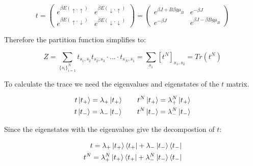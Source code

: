 \documentclass[12pt]{article}
\theoremstyle{plain}
\begin{document}
\begin{equation}
    t = 
    \left( \begin{array}{cc}
        e^{\beta E(\uparrow, \uparrow)} & e^{\beta E(\downarrow, \uparrow)} \\
        e^{\beta E(\uparrow, \downarrow)} & e^{\beta E(\downarrow, \downarrow)}
    \end{array}
    \right) = 
    \left( \begin{array}{cc}
        e^{\beta J + B\beta g\mu_{B}} & e^{-\beta J} \\
        e^{-\beta J} & e^{\beta J - \beta B g\mu_{B}}
    \end{array}
    \right)
    \label{t}
\end{equation}

\vspace{2mm}

\par Therefore the partition function simplifies to:

\vspace{2mm}

\begin{equation*}
    Z = \sum_{\{s_{i}\}_{i=1}^{N}} t_{s_1, s_2}t_{s_2, s_3} \cdot ... \cdot t_{s_N, s_1} = \sum_{s_1} [t^{N}]_{s_1, s_2} = Tr(t^{N})
\end{equation*}

\vspace{2mm}

\par To calculate the trace we need the eigenvalues and eigenstates of the $t$ matrix.

\vspace{2mm}

\begin{align*}
    t \ket{t_+} = \lambda_+ \ket{t_+} \quad \quad t^N \ket{t_+} = \lambda_+^N \ket{t_+} \\
    t \ket{t_-} = \lambda_- \ket{t_-} \quad \quad t^N \ket{t_-} = \lambda_-^N \ket{t_-}
\end{align*}

\vspace{2mm}

\par Since the eigenstates with the eigenvalues give the decompostion of $t$:

\vspace{2mm}

\begin{align*}
    t = \lambda_+ \ket{t_+} \bra{t_+} + \lambda_- \ket{t_-} \bra{t_-} \\
    t^N = \lambda_+^N \ket{t_+} \bra{t_+} + \lambda_-^N \ket{t_-} \bra{t_-}
\end{align*}
\end{document}
